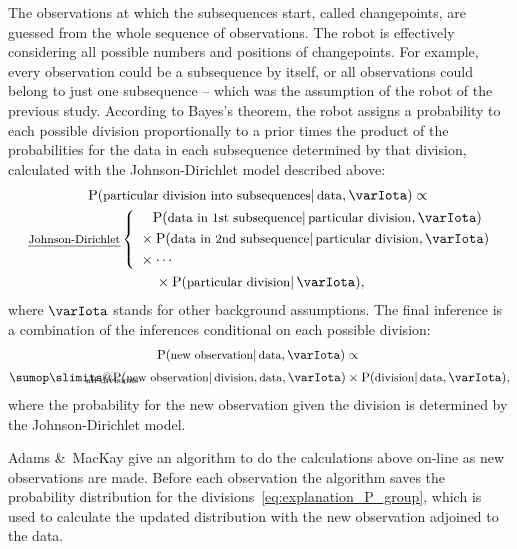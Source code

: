 \documentclass[\ifafour a4paper,12pt,\else a5paper,10pt,\fi%
onecolumn,oneside,article,%
british%
]{memoir}
\makeatletter
\theoremstyle{remark}
\theoremstyle{innote}
\def\sum{\DOTSI\sumop\slimits@}
\newcommand*{\citey}{\parencites*}
\newcommand*{\amp}{\&}
\newcommand*{\p}{\mathrm{P}}%
\renewcommand*{\|}{\mathpunct{|}}
\newcommand*{\ptext}[1]{\text{\small #1}}
\newcommand*{\yI}{\varIota}
\makeatother
\begin{document}
The observations at which the subsequences start, called changepoints, are
guessed from the whole sequence of observations. The robot is effectively
considering all possible numbers and positions of changepoints. For
example, every observation could be a subsequence by itself, or all
observations could belong to just one subsequence -- which was the
assumption of the robot of the previous study. According to Bayes's
theorem, the robot assigns a probability to each possible division
proportionally to a prior times the product of the probabilities for the
data in each subsequence determined by that division, calculated with the
Johnson-Dirichlet model described above:
\begin{multline}
  \label{eq:explanation_P_group}
  \p(\ptext{particular division into subsequences} \| \ptext{data}, \yI)
  \propto{}\\
  \text{\footnotesize\emph{Johnson-Dirichlet}}\left\{\;
    \!\begin{aligned}
        &\quad\p(\ptext{data in 1st subsequence} \| \ptext{particular division}, \yI)
          \\
        &{}\times\p(\ptext{data in 2nd subsequence} \| \ptext{particular division}, \yI)
          \\
              &{}\times\dotsm
  \end{aligned}\right.\\
 {}\times \p(\ptext{particular division} \| \yI),
\end{multline}
where $\yI$ stands for other background assumptions. The final inference is
a combination of the inferences conditional on each possible division:
\begin{multline}
  \label{eq:explanation_group_mixed}
  \p(\ptext{new observation} \| \ptext{data}, \yI) \propto{}\\[\jot]
  \sum_{\mathclap{\text{all divisions}}}
  \p(\ptext{new observation} \| \ptext{division}, \ptext{data}, \yI)
\times  \p(\ptext{division} \| \ptext{data}, \yI),
\end{multline}
where the probability for the new observation given the division is
determined by the Johnson-Dirichlet model.

Adams \amp\ MacKay \citey{adamsetal2007} give an algorithm to do the
calculations above on-line as new observations are made. Before each
observation the algorithm saves the probability distribution for the
divisions~\eqref{eq:explanation_P_group}, which is used to calculate the
updated distribution with the new observation adjoined to the data.
\end{document}
